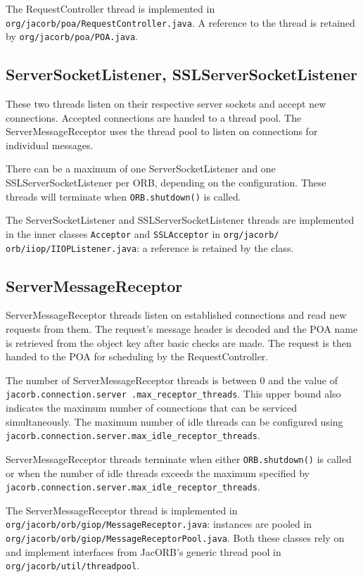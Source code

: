 The RequestController thread is implemented in
{\tt org/jacorb/poa/RequestController.java}. A reference to the thread
is retained by {\tt org/jacorb/poa/POA.java}.

\subsection*{ServerSocketListener, SSLServerSocketListener}
These two threads listen on their respective server sockets and accept new
connections. Accepted connections are handed to a thread pool. The
ServerMessageReceptor uses the thread pool to listen on connections for
individual messages.

There can be a maximum of one ServerSocketListener and one
SSLServerSocketListener per ORB, depending on the configuration. These threads
will terminate when {\tt ORB.shutdown()} is called.

The ServerSocketListener and SSLServerSocketListener threads are implemented
in the inner classes {\tt Acceptor} and {\tt SSLAcceptor} in
{\tt org/jacorb/ orb/iiop/IIOPListener.java}: a reference is retained by the
class.

\subsection*{ServerMessageReceptor}
ServerMessageReceptor threads listen on established connections and read new
requests from them. The request's message header is decoded and the POA
name is retrieved from the object key after basic checks are made. The request
is then handed to the POA for scheduling by the RequestController.

The number of ServerMessageReceptor threads is between 0 and the value of
{\tt jacorb.connection.server .max\_receptor\_threads}. This upper bound
also indicates the maximum number of connections that can be serviced
simultaneously. The maximum number of idle threads can be configured using
{\tt jacorb.connection.server.max\_idle\_receptor\_threads}.

ServerMessageReceptor threads terminate when either {\tt ORB.shutdown()} is
called or when the number of idle threads exceeds the maximum specified by
{\tt jacorb.connection.server.max\_idle\_receptor\_threads}.

The ServerMessageReceptor thread is implemented in
{\tt org/jacorb/orb/giop/MessageReceptor.java}: instances are pooled in
{\tt org/jacorb/orb/giop/MessageReceptorPool.java}. Both these classes rely on
and implement interfaces from JacORB's generic thread pool in
{\tt org/jacorb/util/threadpool}.


